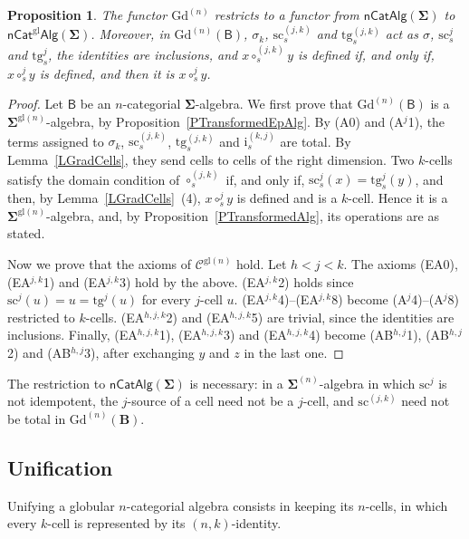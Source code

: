 \documentclass[a4paper,reqno]{amsart}
\newcommand{\sig}[1]{\mathbf{#1}}                %
\newcommand{\calg}[1]{\boldsymbol{\mathsf{#1}}}  %
\newcommand{\gl}{\mathrm{gl}}
\newcommand{\src}{\mathrm{sc}}
\newcommand{\tgt}{\mathrm{tg}}
\newcommand{\ii}{\mathrm{i}}
\newcommand{\Gd}{\mathrm{Gd}}
\theoremstyle{plain}
\newtheorem{proposition}[theorem]{Proposition}
\theoremstyle{definition}
\begin{document}
\begin{proposition}\label{PGradDerivor}
The functor $\Gd^{(n)}$ restricts to a functor from $\mathsf{nCatAlg}(\sig{\Sigma})$ to $\mathsf{nCat}^{\gl}\mathsf{Alg}(\sig{\Sigma})$.
Moreover, in $\Gd^{(n)}(\calg{B})$, $\sigma_{k}$, $\src^{(j,k)}_{s}$ and $\tgt^{(j,k)}_{s}$ act as $\sigma$, $\src^{j}_{s}$ and $\tgt^{j}_{s}$, the identities are inclusions, and $x\circ^{(j,k)}_{s}y$ is defined if, and only if, $x\circ^{j}_{s}y$ is defined, and then it is $x\circ^{j}_{s}y$.
\end{proposition}
\begin{proof}
Let $\calg{B}$ be an $n$-categorial $\sig{\Sigma}$-algebra.
We first prove that $\Gd^{(n)}(\calg{B})$ is a $\sig{\Sigma}^{\gl(n)}$-algebra, by Proposition~\ref{PTransformedEpAlg}.
By (A0) and (A$^{j}$1), the terms assigned to $\sigma_{k}$, $\src^{(j,k)}_{s}$, $\tgt^{(j,k)}_{s}$ and $\ii^{(k,j)}_{s}$ are total.
By Lemma~\ref{LGradCells}, they send cells to cells of the right dimension.
Two $k$-cells satisfy the domain condition of $\circ^{(j,k)}_{s}$ if, and only if, $\src^{j}_{s}(x)=\tgt^{j}_{s}(y)$, and then, by Lemma~\ref{LGradCells}~(4), $x\circ^{j}_{s}y$ is defined and is a $k$-cell.
Hence it is a $\sig{\Sigma}^{\gl(n)}$-algebra, and, by Proposition~\ref{PTransformedAlg}, its operations are as stated.

Now we prove that the axioms of $\mathcal{C}^{\gl(n)}$ hold.
Let $h<j<k$.
The axioms (EA0), (EA$^{j,k}$1) and (EA$^{j,k}$3) hold by the above.
(EA$^{j,k}$2) holds since $\src^{j}(u)=u=\tgt^{j}(u)$ for every $j$-cell $u$.
(EA$^{j,k}$4)--(EA$^{j,k}$8) become (A$^{j}$4)--(A$^{j}$8) restricted to $k$-cells.
(EA$^{h,j,k}$2) and (EA$^{h,j,k}$5) are trivial, since the identities are inclusions.
Finally, (EA$^{h,j,k}$1), (EA$^{h,j,k}$3) and (EA$^{h,j,k}$4) become (AB$^{h,j}$1), (AB$^{h,j}$2) and (AB$^{h,j}$3), after exchanging $y$ and $z$ in the last one.
\end{proof}

The restriction to $\mathsf{nCatAlg}(\sig{\Sigma})$ is necessary: in a $\sig{\Sigma}^{(n)}$-algebra in which $\src^{j}$ is not idempotent, the $j$-source of a cell need not be a $j$-cell, and $\src^{(j,k)}$ need not be total in $\Gd^{(n)}(\mathbf{B})$.

\subsection{Unification}

Unifying a globular $n$-categorial algebra consists in keeping its $n$-cells, in which every $k$-cell is represented by its $(n,k)$-identity.
\end{document}
